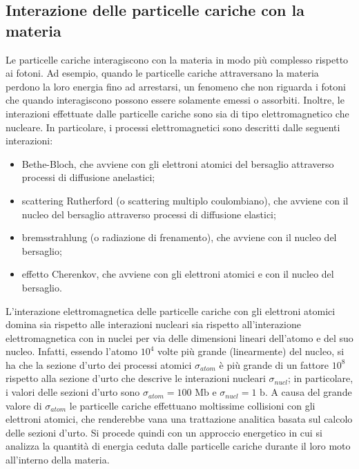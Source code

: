 \documentclass[12pt,a4paper,twoside]{report}
\begin{document}
	\subsection{Interazione delle particelle cariche con la materia}
	Le particelle cariche interagiscono con la materia in modo più complesso rispetto ai fotoni. Ad esempio, quando le particelle cariche attraversano la materia perdono la loro energia fino ad arrestarsi, un fenomeno che non riguarda i fotoni che quando interagiscono possono essere solamente emessi o assorbiti. Inoltre, le interazioni effettuate dalle particelle cariche sono sia di tipo elettromagnetico che nucleare. In particolare, i processi elettromagnetici sono descritti dalle seguenti interazioni:
	\begin{itemize}
		\item Bethe-Bloch, che avviene con gli elettroni atomici del bersaglio attraverso processi di diffusione anelastici;
		\item scattering Rutherford (o scattering multiplo coulombiano), che avviene con il nucleo del bersaglio attraverso processi di diffusione elastici;
		\item bremsstrahlung (o radiazione di frenamento), che avviene con il nucleo del bersaglio;
		\item effetto Cherenkov, che avviene con gli elettroni atomici e con il nucleo del bersaglio.
	\end{itemize}
	L'interazione elettromagnetica delle particelle cariche con gli elettroni atomici domina sia rispetto alle interazioni nucleari sia rispetto all'interazione elettromagnetica con in nuclei per via delle dimensioni lineari dell'atomo e del suo nucleo. Infatti, essendo l'atomo $10^4$ volte più grande (linearmente) del nucleo, si ha che la sezione d'urto dei processi atomici $\sigma_{atom}$ è più grande di un fattore $10^8$ rispetto alla sezione d'urto che descrive le interazioni nucleari $\sigma_{nucl}$; in particolare, i valori delle sezioni d'urto sono $\sigma_{atom}=100\mbox{ Mb}$ e $\sigma_{nucl}=1\mbox{ b}$. A causa del grande valore di $\sigma_{atom}$ le particelle cariche effettuano moltissime collisioni con gli elettroni atomici, che renderebbe vana una trattazione analitica basata sul calcolo delle sezioni d'urto. Si procede quindi con un approccio energetico in cui si analizza la quantità di energia ceduta dalle particelle cariche durante il loro moto all'interno della materia.
	
\end{document}
